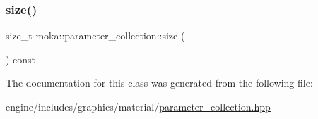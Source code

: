 \mbox{\label{classmoka_1_1parameter__collection_a4e553f37469125fc4191889134761ff7}} 
\subsubsection{\texorpdfstring{size()}{size()}}
{\footnotesize\ttfamily size\+\_\+t moka\+::parameter\+\_\+collection\+::size (\begin{DoxyParamCaption}{ }\end{DoxyParamCaption}) const}



The documentation for this class was generated from the following file\+:\begin{DoxyCompactItemize}
\item 
engine/includes/graphics/material/\mbox{\hyperlink{parameter__collection_8hpp}{parameter\+\_\+collection.\+hpp}}\end{DoxyCompactItemize}

